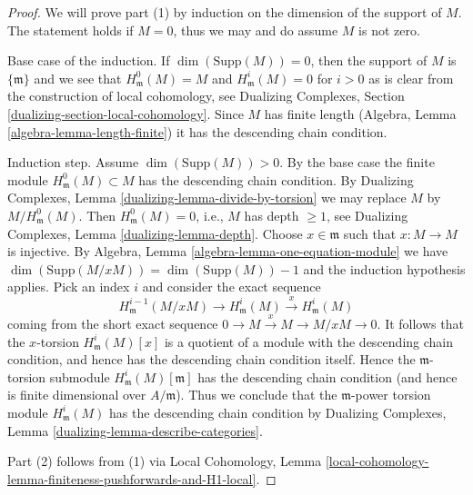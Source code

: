 \begin{proof}
We will prove part (1) by induction on the dimension of the support of $M$.
The statement holds if $M = 0$, thus we may and do assume $M$ is not zero.

\medskip\noindent
Base case of the induction.
If $\dim(\text{Supp}(M)) = 0$, then the support
of $M$ is $\{\mathfrak m\}$ and we see that $H^0_\mathfrak m(M) = M$
and $H^i_\mathfrak m(M) = 0$ for $i > 0$ as is clear from the
construction of local cohomology, see
Dualizing Complexes, Section \ref{dualizing-section-local-cohomology}.
Since $M$ has finite length (Algebra, Lemma \ref{algebra-lemma-length-finite})
it has the descending chain condition.

\medskip\noindent
Induction step. Assume $\dim(\text{Supp}(M)) > 0$.
By the base case the finite module $H^0_\mathfrak m(M) \subset M$
has the descending chain condition.
By Dualizing Complexes, Lemma \ref{dualizing-lemma-divide-by-torsion}
we may replace $M$ by $M/H^0_\mathfrak m(M)$.
Then $H^0_\mathfrak m(M) = 0$, i.e., $M$ has depth $\geq 1$, see
Dualizing Complexes, Lemma \ref{dualizing-lemma-depth}.
Choose $x \in \mathfrak m$ such that $x : M \to M$ is injective.
By Algebra, Lemma \ref{algebra-lemma-one-equation-module} we have
$\dim(\text{Supp}(M/xM)) = \dim(\text{Supp}(M)) - 1$ and the
induction hypothesis applies. Pick an index $i$ and consider the
exact sequence
$$
H^{i - 1}_\mathfrak m(M/xM) \to H^i_\mathfrak m(M) \xrightarrow{x}
H^i_\mathfrak m(M)
$$
coming from the short exact sequence $0 \to M \xrightarrow{x} M \to M/xM \to 0$.
It follows that the $x$-torsion $H^i_\mathfrak m(M)[x]$
is a quotient of a module with the descending chain condition, and
hence has the descending chain condition itself. Hence the
$\mathfrak m$-torsion submodule $H^i_\mathfrak m(M)[\mathfrak m]$ has
the descending chain condition (and hence is finite dimensional
over $A/\mathfrak m$). Thus we conclude that the $\mathfrak m$-power
torsion module $H^i_\mathfrak m(M)$ has the descending chain
condition by Dualizing Complexes, Lemma
\ref{dualizing-lemma-describe-categories}.

\medskip\noindent
Part (2) follows from (1) via Local Cohomology,
Lemma \ref{local-cohomology-lemma-finiteness-pushforwards-and-H1-local}.
\end{proof}

